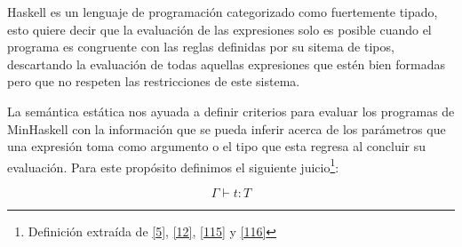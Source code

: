     \textsf{Haskell} es un lenguaje de programación categorizado como fuertemente tipado, esto quiere decir que la evaluación de las expresiones solo es posible cuando el programa es congruente con las reglas definidas por su sitema de tipos, descartando la evaluación de todas aquellas expresiones que estén bien formadas pero que no respeten las restricciones de este sistema. \\


    \begin{definition}
       La semántica estática nos ayuada a definir criterios para evaluar los programas de \textsf{MinHaskell} con la información que se pueda inferir acerca de los parámetros que una expresión toma como argumento o el tipo que esta regresa al concluir su evaluación. Para este propósito definimos el siguiente juicio\footnote{Definición extraída de  \hyperlink{5}{[5]},  \hyperlink{12}{[12]}, \hyperlink{115}{[115]} y \hyperlink{116}{[116]}}:
    
    $$\Gamma\vdash t: T$$
    

\end{definition}
